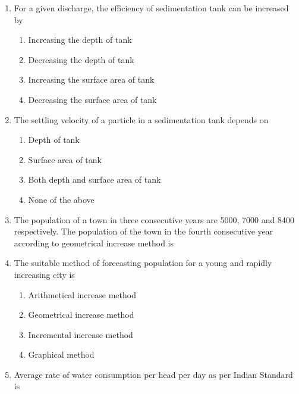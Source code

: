 \documentclass[11pt,a4paper]{article}
\begin{document}
\begin{enumerate}
\item{For a given discharge, the efficiency of sedimentation tank can be increased by}
\begin{enumerate}[label=\Alph*.]
\item{Increasing the depth of tank}
\item{Decreasing the depth of tank}
\item{Increasing the surface area of tank}
\item{Decreasing the surface area of tank}
\end{enumerate}
\item{The settling velocity of a particle in a sedimentation tank depends on}
\begin{enumerate}[label=\Alph*.]
\item{Depth of tank}
\item{Surface area of tank}
\item{Both depth and surface area of tank}
\item{None of the above}
\end{enumerate}
\item{The population of a town in three consecutive years are 5000, 7000 and 8400 respectively. The population of the town in the fourth consecutive year according to geometrical increase method is}
\\
\item{The suitable method of forecasting population for a young and rapidly increasing city is}
\begin{enumerate}[label=\Alph*.]
\item{Arithmetical increase method}
\item{Geometrical increase method}
\item{Incremental increase method}
\item{Graphical method}
\end{enumerate}
\item{Average rate of water consumption per head per day as per Indian Standard is}
\\
\end{enumerate}
\end{document}
